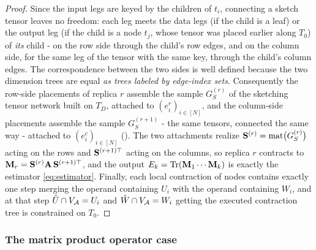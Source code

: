 \documentclass[11pt]{article}
\theoremstyle{plain}
\theoremstyle{definition}
\theoremstyle{remark}
\begin{document}
\begin{proof}
Since the input legs are keyed by the children of $t_i$, connecting a
sketch tensor leaves no freedom: each leg meets the data legs (if the
child is a leaf) or the output leg (if the child is a node $t_j$, whose
tensor was placed earlier along $T_0$) of \emph{its} child - on the
row side through the child's row edges, and on the column side, for the
same leg of the tensor with the same key, through the child's column
edges. The correspondence between the two sides is well defined because
the two dimension trees are equal \emph{as trees labeled by edge-index
sets}. Consequently the row-side placements of replica $r$ assemble the
sample $G_S^{(r)}$ of the sketching tensor network built on $T_D$,
attached to $(e_i^{r})_{i\in[N]}$, and the column-side placements
assemble the sample $G_S^{(r+1)}$ - the same tensors, connected the
same way - attached to $(e_i^{c})_{i\in[N]}$
(). The two attachments realize
$\mathbf{S}^{(r)}=\mathrm{mat}\bigl(G_S^{(r)}\bigr)$ acting on the rows and
$\mathbf{S}^{(r+1)\top}$ acting on the columns, so replica $r$ contracts to
$\mathbf{M}_r=\mathbf{S}^{(r)}\mathbf{A}\,\mathbf{S}^{(r+1)\top}$, and the output
$E_k=\mathop{\mathrm{Tr}}(\mathbf{M}_1\cdots\mathbf{M}_k)$ is exactly the estimator
\eqref{eq:estimator}.
Finally, each local contraction of nodes contains exactly one step
merging the operand containing $U_i$ with the operand containing $W_i$, and
at that step $\hat U\cap V_{\mathcal{A}}=U_i$ and $\hat W\cap V_{\mathcal{A}}=W_i$ getting
the executed contraction tree is constrained on $T_0$.
\end{proof}
\subsubsection{The matrix product operator case}
\label{sec:alg-mpo}
\end{document}
